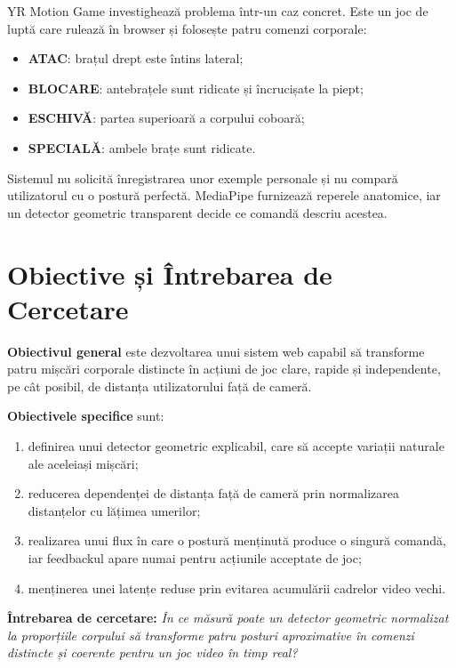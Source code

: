\documentclass[12pt, a4paper]{article}
\begin{document}
YR Motion Game investighează problema într-un caz concret. Este un joc de luptă care
rulează în browser și folosește patru comenzi corporale:

\begin{itemize}[nosep]
    \item \textbf{ATAC}: brațul drept este întins lateral;
    \item \textbf{BLOCARE}: antebrațele sunt ridicate și încrucișate la piept;
    \item \textbf{ESCHIVĂ}: partea superioară a corpului coboară;
    \item \textbf{SPECIALĂ}: ambele brațe sunt ridicate.
\end{itemize}

Sistemul nu solicită înregistrarea unor exemple personale și nu compară utilizatorul
cu o postură perfectă. MediaPipe furnizează reperele anatomice, iar un detector
geometric transparent decide ce comandă descriu acestea.

\section{Obiective și Întrebarea de Cercetare}

\textbf{Obiectivul general} este dezvoltarea unui sistem web capabil să transforme
patru mișcări corporale distincte în acțiuni de joc clare, rapide și independente,
pe cât posibil, de distanța utilizatorului față de cameră.

\textbf{Obiectivele specifice} sunt:

\begin{enumerate}[nosep]
    \item definirea unui detector geometric explicabil, care să accepte variații
    naturale ale aceleiași mișcări;
    \item reducerea dependenței de distanța față de cameră prin normalizarea
    distanțelor cu lățimea umerilor;
    \item realizarea unui flux în care o postură menținută produce o singură comandă,
    iar feedbackul apare numai pentru acțiunile acceptate de joc;
    \item menținerea unei latențe reduse prin evitarea acumulării cadrelor video vechi.
\end{enumerate}

\textbf{Întrebarea de cercetare:} \textit{În ce măsură poate un detector geometric
normalizat la proporțiile corpului să transforme patru posturi aproximative în
comenzi distincte și coerente pentru un joc video în timp real?}
\end{document}
